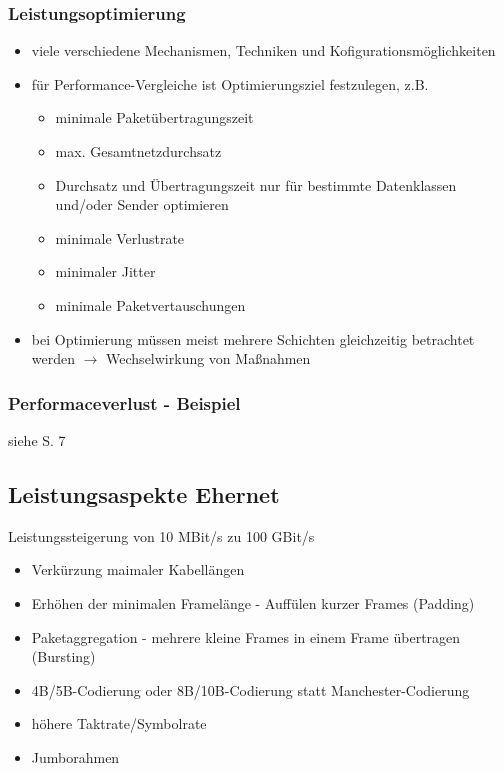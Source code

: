 \subsubsection{Leistungsoptimierung}
\begin{itemize}
	\item viele verschiedene Mechanismen, Techniken und Kofigurationsmöglichkeiten
		\item für Performance-Vergleiche ist Optimierungsziel festzulegen, z.B.
		\begin{itemize}
			\item minimale Paketübertragungszeit
			\item max. Gesamtnetzdurchsatz
			\item Durchsatz und Übertragungszeit nur für bestimmte Datenklassen und/oder Sender optimieren
			\item minimale Verlustrate
			\item minimaler Jitter
			\item minimale Paketvertauschungen
		\end{itemize}
		\item bei Optimierung müssen meist mehrere Schichten gleichzeitig betrachtet werden $\to$ Wechselwirkung von Maßnahmen
\end{itemize}
\subsubsection{Performaceverlust - Beispiel}
siehe S. 7
\subsection{Leistungsaspekte Ehernet}
Leistungssteigerung von 10 MBit/s zu 100 GBit/s
\begin{itemize}
	\item Verkürzung maimaler Kabellängen
	\item Erhöhen der minimalen Framelänge - Auffülen kurzer Frames (Padding)
	\item Paketaggregation - mehrere kleine Frames in einem Frame übertragen (Bursting)
	\item 4B/5B-Codierung oder 8B/10B-Codierung statt Manchester-Codierung
	\item höhere Taktrate/Symbolrate
	\item Jumborahmen
\end{itemize}
